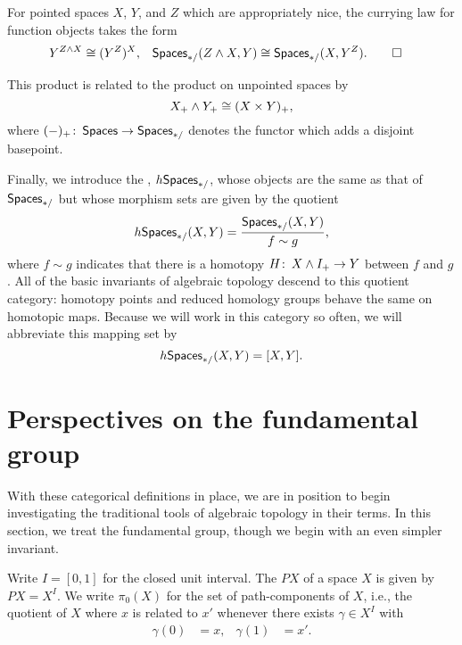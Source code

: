 \begin{corollary}
For pointed spaces $X$, $Y$, and $Z$ which are appropriately nice, the currying law for function objects takes the form
\begin{align*}
Y^{Z \wedge X} & \cong (Y^Z)^X, &
\mathsf{Spaces}_{*/}(Z \wedge X, Y) & \cong \mathsf{Spaces}_{*/}(X, Y^Z). \qed
\end{align*}
\end{corollary}

\begin{lemma}\pushQED{\qed}
This product is related to the product on unpointed spaces by \[X_+ \wedge Y_+ \cong (X \times Y)_+,\] where $(-)_+\colon\thinspace \mathsf{Spaces} \to \mathsf{Spaces}_{*/}$ denotes the functor which adds a disjoint basepoint. \qedhere \popQED
\end{lemma}

\begin{definition}\label{HoCatDefn}%
Finally, we introduce the , $h\mathsf{Spaces}_{*/}$, whose objects are the same as that of $\mathsf{Spaces}_{*/}$ but whose morphism sets are given by the quotient \[h\mathsf{Spaces}_{*/}(X, Y) = \frac{\mathsf{Spaces}_{*/}(X, Y)}{f \sim g},\] where $f \sim g$ indicates that there is a homotopy $H\colon\thinspace X \wedge I_+ \to Y$ between $f$ and $g$.
All of the basic invariants of algebraic topology descend to this quotient category: homotopy points and reduced homology groups behave the same on homotopic maps.
Because we will work in this category so often, we will abbreviate this mapping set by \[h\mathsf{Spaces}_{*/}(X, Y) = [X, Y].\]
\end{definition}




\section{Perspectives on the fundamental group}

With these categorical definitions in place, we are in position to begin investigating the traditional tools of algebraic topology in their terms.
In this section, we treat the fundamental group, though we begin with an even simpler invariant.

\begin{definition}
Write $I = [0, 1]$ for the closed unit interval.
The  $PX$ of a space $X$ is given by $PX = X^I$.
We write $\pi_0(X)$ for the set of path-components of $X$, i.e., the quotient of $X$ where $x$ is related to $x'$ whenever there exists $\gamma \in X^I$ with
\begin{align*}
\gamma(0) & = x, &
\gamma(1) & = x'.
\end{align*}
\end{definition}

